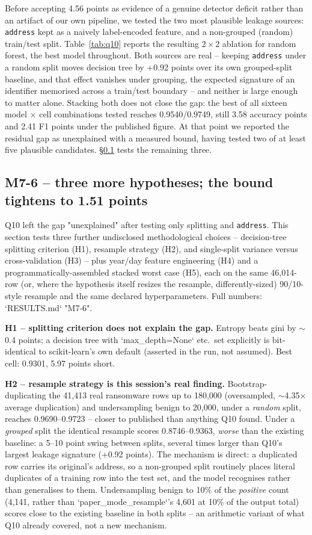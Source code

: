 \documentclass[conference]{IEEEtran}
\begin{document}
Before accepting 4.56 points as evidence of a genuine detector deficit rather than an artifact
of our own pipeline, we tested the two most plausible leakage sources: \texttt{address} kept as
a naively label-encoded feature, and a non-grouped (random) train/test split. Table~\ref{tab:q10}
reports the resulting $2\times2$ ablation for random forest, the best model throughout. Both
sources are real -- keeping \texttt{address} under a random split moves decision tree by +0.92
points over its own grouped-split baseline, and that effect vanishes under grouping, the expected
signature of an identifier memorised across a train/test boundary -- and neither is large enough
to matter alone. Stacking both does not close the gap: the best of all sixteen model $\times$
cell combinations tested reaches 0.9540/0.9749, still 3.58 accuracy points and 2.41 F1 points
under the published figure. At that point we reported the residual gap as unexplained with a
measured bound, having tested two of at least five plausible candidates. \S\ref{sec:m76} tests
the remaining three.
\subsection{M7-6 -- three more hypotheses; the bound tightens to 1.51 points}
\label{sec:m76}

Q10 left the gap "unexplained" after testing only splitting and \texttt{address}. This section
tests three further undisclosed methodological choices -- decision-tree splitting criterion (H1),
resample strategy (H2), and single-split variance versus cross-validation (H3) -- plus year/day
feature engineering (H4) and a programmatically-assembled stacked worst case (H5), each on the
same 46{,}014-row (or, where the hypothesis itself resizes the resample, differently-sized)
90/10-style resample and the same declared hyperparameters. Full numbers: `RESULTS.md` "M7-6".

\textbf{H1 -- splitting criterion does not explain the gap.} Entropy beats gini by
$\sim$0.4 points; a decision tree with `max\_depth=None` etc.\ set explicitly is bit-identical to
scikit-learn's own default (asserted in the run, not assumed). Best cell: 0.9301, 5.97 points
short.

\textbf{H2 -- resample strategy is this session's real finding.} Bootstrap-duplicating the
41{,}413 real ransomware rows up to 180{,}000 (oversampled, $\sim$4.35$\times$ average
duplication) and undersampling benign to 20{,}000, under a \emph{random} split, reaches
0.9690--0.9723 -- closer to published than anything Q10 found. Under a \emph{grouped} split the
identical resample scores 0.8746--0.9363, \emph{worse} than the existing baseline: a 5--10 point
swing between splits, several times larger than Q10's largest leakage signature (+0.92 points).
The mechanism is direct: a duplicated row carries its original's address, so a non-grouped split
routinely places literal duplicates of a training row into the test set, and the model recognises
rather than generalises to them. Undersampling benign to 10\% of the \emph{positive} count
(4{,}141, rather than `paper\_mode\_resample`'s 4{,}601 at 10\% of the output total) scores close
to the existing baseline in both splits -- an arithmetic variant of what Q10 already covered, not
a new mechanism.
\end{document}
